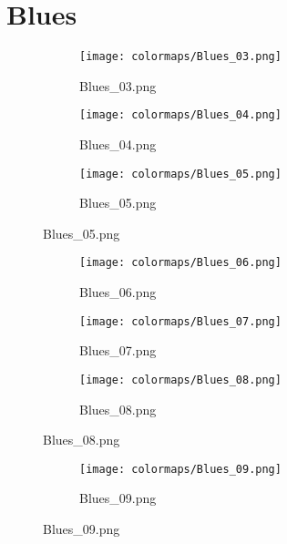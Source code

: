 \documentclass{article}%
\begin{document}
%
\newpage%
\section{Blues}%
\label{sec:Blues}%
\hspace{1cm}\hfill%
\hspace{1cm}\hfill%
\hspace{1cm}\hfill%


\begin{figure}[h!]%
\begin{subfigure}[b]{0.3\linewidth}%
\texttt{[image: colormaps/Blues\_03.png]}%
\caption{Blues\_03.png}%
\end{subfigure}%
\begin{subfigure}[b]{0.3\linewidth}%
\texttt{[image: colormaps/Blues\_04.png]}%
\caption{Blues\_04.png}%
\end{subfigure}%
\begin{subfigure}[b]{0.3\linewidth}%
\texttt{[image: colormaps/Blues\_05.png]}%
\caption{Blues\_05.png}%
\end{subfigure}%
\end{figure}

%
\hspace{1cm}\hfill%
\hspace{1cm}\hfill%
\hspace{1cm}\hfill%


\begin{figure}[h!]%
\begin{subfigure}[b]{0.3\linewidth}%
\texttt{[image: colormaps/Blues\_06.png]}%
\caption{Blues\_06.png}%
\end{subfigure}%
\begin{subfigure}[b]{0.3\linewidth}%
\texttt{[image: colormaps/Blues\_07.png]}%
\caption{Blues\_07.png}%
\end{subfigure}%
\begin{subfigure}[b]{0.3\linewidth}%
\texttt{[image: colormaps/Blues\_08.png]}%
\caption{Blues\_08.png}%
\end{subfigure}%
\end{figure}

%
\hspace{1cm}\hfill%


\begin{figure}[h!]%
\begin{subfigure}[b]{0.3\linewidth}%
\texttt{[image: colormaps/Blues\_09.png]}%
\caption{Blues\_09.png}%
\end{subfigure}%
\end{figure}
\end{document}
